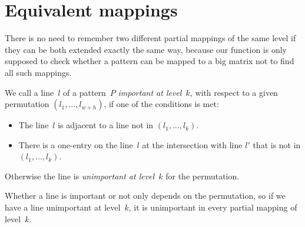 \section{Equivalent mappings}
There is no need to remember two different partial mappings of the same level if they can be both extended exactly the same way, because our function is only supposed to check whether a pattern can be mapped to a big matrix not to find all such mappings.
\begin{defn}
We call a line~$l$ of a pattern~$P$ \emph{important at level~$k$}, with respect to a given permutation $(l_1,\dots,l_{w+h})$, if one of the conditions is met:
\begin{itemize}
\item The line~$l$ is adjacent to a line not in $(l_1,\dots,l_k)$.
\item There is a one-entry on the line~$l$ at the intersection with line $l'$ that is not in $(l_1,\dots,l_k)$.
\end{itemize}
Otherwise the line is \emph{unimportant at level~$k$} for the permutation.
\end{defn}
Whether a line is important or not only depends on the permutation, so if we have a line unimportant at level~$k$, it is unimportant in every partial mapping of level~$k$.

